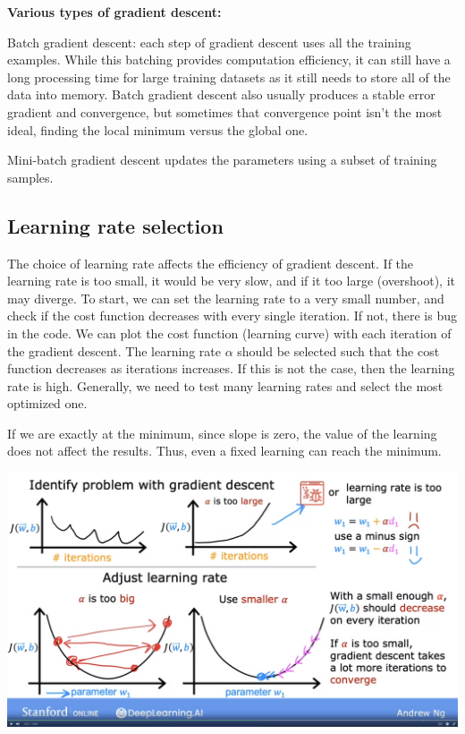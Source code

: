 \documentclass[12pt]{report}
\begin{document}
\textbf{Various types of gradient descent: }

Batch gradient descent: each step of gradient descent uses all the training examples. While this batching provides computation efficiency, it can still have a long processing time for large training datasets as it still needs to store all of the data into memory. Batch gradient descent also usually produces a stable error gradient and convergence, but sometimes that convergence point isn't the most ideal, finding the local minimum versus the global one.

Mini-batch gradient descent updates the parameters using a subset of training samples.

\subsection{Learning rate selection}
\label{sec:learningRate}
The choice of learning rate affects the efficiency of gradient descent. If the learning rate is too small, it would be very slow, and if it too large (overshoot), it may diverge. To start, we can set the learning rate to a very small number, and check if the cost function decreases with every single iteration. If not, there is bug in the code. We can plot the cost function (learning curve) with each iteration of the gradient descent. The learning rate $\alpha$ should be selected such that the cost function decreases as iterations increases. If this is not the case, then the learning rate is high. Generally, we need to test many learning rates and select the most optimized one.

If we are exactly at the minimum, since slope is zero, the value of the learning does not affect the results. Thus, even a fixed learning can reach the minimum.

\includegraphics[scale=0.12]{pics/LearningRate.png}
\end{document}
